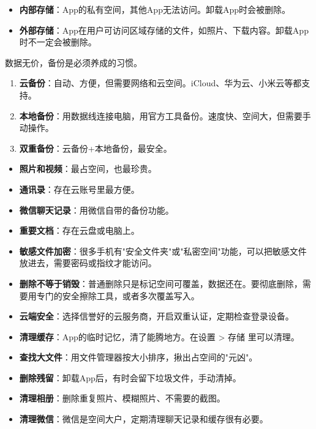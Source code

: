
\begin{itemize}
  \item \textbf{内部存储}：App的私有空间，其他App无法访问。卸载App时会被删除。
  \item \textbf{外部存储}：App在用户可访问区域存储的文件，如照片、下载内容。卸载App时不一定会被删除。
\end{itemize}


数据无价，备份是必须养成的习惯。


\begin{enumerate}
  \item \textbf{云备份}：自动、方便，但需要网络和云空间。iCloud、华为云、小米云等都支持。
  \item \textbf{本地备份}：用数据线连接电脑，用官方工具备份。速度快、空间大，但需要手动操作。
  \item \textbf{双重备份}：云备份+本地备份，最安全。
\end{enumerate}


\begin{itemize}
  \item \textbf{照片和视频}：最占空间，也最珍贵。
  \item \textbf{通讯录}：存在云账号里最方便。
  \item \textbf{微信聊天记录}：用微信自带的备份功能。
  \item \textbf{重要文档}：存在云盘或电脑上。
\end{itemize}


\begin{itemize}
  \item \textbf{敏感文件加密}：很多手机有"安全文件夹"或"私密空间"功能，可以把敏感文件放进去，需要密码或指纹才能访问。
  \item \textbf{删除不等于销毁}：普通删除只是标记空间可覆盖，数据还在。要彻底删除，需要用专门的安全擦除工具，或者多次覆盖写入。
  \item \textbf{云端安全}：选择信誉好的云服务商，开启双重认证，定期检查登录设备。
\end{itemize}


\begin{itemize}
  \item \textbf{清理缓存}：App的临时记忆，清了能腾地方。在设置 > 存储 里可以清理。
  \item \textbf{查找大文件}：用文件管理器按大小排序，揪出占空间的"元凶"。
  \item \textbf{删除残留}：卸载App后，有时会留下垃圾文件，手动清掉。
  \item \textbf{清理相册}：删除重复照片、模糊照片、不需要的截图。
  \item \textbf{清理微信}：微信是空间大户，定期清理聊天记录和缓存很有必要。
\end{itemize}

